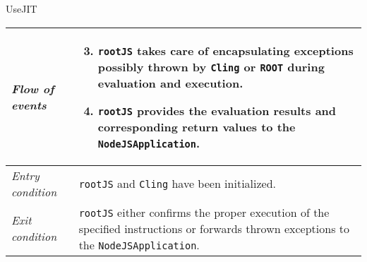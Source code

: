 \begin{frame}[t]{UseJIT}
        \begin{longtable}{p{3cm} @{\hskip 1cm} p{7cm}}
                \textit{Flow of events} &
                        \begin{enumerate}
                                \setcounter{enumi}{2}
                                \item \texttt{rootJS} takes care of encapsulating exceptions possibly thrown by \texttt{Cling} or \texttt{ROOT} during evaluation and execution.
                                \pause
                                \item \texttt{rootJS} provides the evaluation results and corresponding return values to the \texttt{NodeJSApplication}.
                        \end{enumerate}
                        \\
                \hline

                \textit{Entry condition} & \texttt{rootJS} and \texttt{Cling} have been initialized.\\
                \hline

                \textit{Exit condition} & \texttt{rootJS} either confirms the proper execution of the specified instructions or forwards thrown exceptions to the \texttt{NodeJSApplication}.\\
                \hline
        \end{longtable}
\end{frame}
